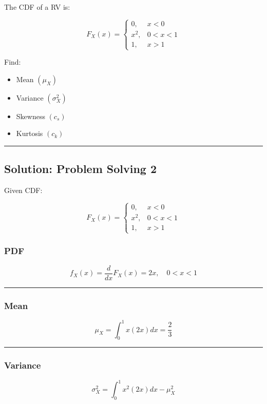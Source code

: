 \documentclass[12pt]{article}
\begin{document}
The CDF of a RV is:

\[
F_X(x)=
\begin{cases}
0, & x<0 \\
x^2, & 0<x<1 \\
1, & x>1
\end{cases}
\]

Find:

\begin{itemize}
    \item Mean $(\mu_X)$
    \item Variance $(\sigma_X^2)$
    \item Skewness $(c_s)$
    \item Kurtosis $(c_k)$
\end{itemize}

\hrule
\vspace{1em}

\subsection*{\textbf{Solution: Problem Solving 2}}

Given CDF:

\[
F_X(x)=
\begin{cases}
0, & x<0 \\
x^2, & 0<x<1 \\
1, & x>1
\end{cases}
\]

\subsubsection*{\textbf{PDF}}

\[
f_X(x)=\frac{d}{dx}F_X(x)=2x,\quad 0<x<1
\]

\hrule
\vspace{1em}

\subsubsection*{\textbf{Mean}}

\[
\mu_X=\int_0^1 x(2x)dx=\frac{2}{3}
\]

\hrule
\vspace{1em}

\subsubsection*{\textbf{Variance}}

\[
\sigma_X^2=\int_0^1 x^2(2x)dx-\mu_X^2
\]
\end{document}

